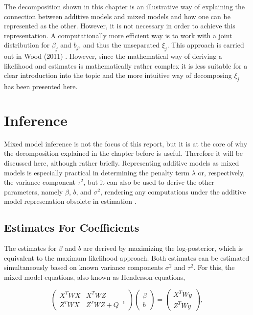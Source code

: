 \documentclass[12pt]{article}
\begin{document}
The decomposition shown in this chapter is an illustrative way of explaining the connection between additive models and mixed models and how one can be represented as the other. However, it is not necessary in order to achieve this representation. A computationally more efficient way is to work with a joint distribution for $\beta_j$ and $b_j$, and thus the unseparated $\xi_j$. This approach is carried out in Wood (2011) \cite{wood2011fast}. However, since the mathematical way of deriving a likelihood and estimates is mathematically rather complex it is less suitable for a clear introduction into the topic and the more intuitive way of decomposing $\xi_j$ has been presented here.







\section{Inference} %

Mixed model inference is not the focus of this report, but it is at the core of why the decomposition explained in the chapter before is useful. Therefore it will be discussed here, although rather briefly. Representing additive models as mixed models is especially practical in determining the penalty term $\lambda$ or, respectively, the variance component $\tau^2$, but it can also be used to derive the other parameters, namely $\beta$, $b$, and $\sigma^2$, rendering any computations under the additive model represenation obsolete in estimation \cite{fahrmeir2013regression, kneib2006mixed}. 

\subsection{Estimates For Coefficients}

The estimates for $\beta$ and $b$ are derived by maximizing the log-posterior, which is equivalent to the maximum likelihood approach. Both estimates can be estimated simultaneously based on known variance components $\sigma^2$ and $\tau^2$. For this, the mixed model equations, also known as Henderson equations, 

$$\begin{pmatrix}
X^TWX & X^TWZ \\
Z^TWX & Z^TWZ + Q^{-1}
\end{pmatrix}
\begin{pmatrix}
\beta\\
b
\end{pmatrix} =
\begin{pmatrix}
X^TWy \\
Z^TWy
\end{pmatrix},\label{henderson}$$
\end{document}
